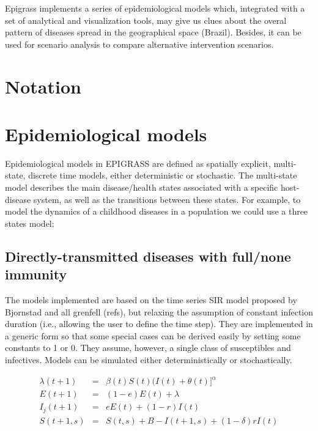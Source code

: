 \documentclass[a4paper,12pt]{article}
\begin{document}
Epigrass implements a series of epidemiological models which, integrated with a set of analytical and visualization tools,  may give us clues about the overal pattern of diseases spread in the geographical space (Brazil). Besides, it can be used for scenario analysis to compare alternative intervention scenarios. 



\section{Notation}

\section{Epidemiological models}

Epidemiological models in EPIGRASS are defined as spatially explicit, multi-state, discrete time models, either deterministic or stochastic. The multi-state model describes the main disease/health states associated with a specific host-disease system, as well as the transitions between these states. For example, to model the dynamics of a childhood diseases in a population we could use a three states model:

\subsection{Directly-transmitted diseases with full/none immunity}
The models implemented are based on the time series SIR model proposed by Bjornstad and all grenfell (refs), but relaxing the assumption of constant infection duration (i.e., allowing the user to define the time step). They are implemented in a generic form so that some special cases can be derived easily by setting some constants to 1 or 0. They assume, however, a single class of susceptibles and infectives. Models can be simulated either deterministically or stochastically. 

\begin{eqnarray}
\lambda(t+1) &=& \beta(t)S(t)(I(t)+\theta(t)]^\alpha\\
E(t+1) &=& (1-e)E(t) +\lambda\\
I_j(t+1)&=& e E(t) + (1-r)I(t)\\
S(t+1,s) &=& S(t,s) + B - I(t+1,s) + (1-\delta) rI(t)
\end{eqnarray} 
\end{document}
